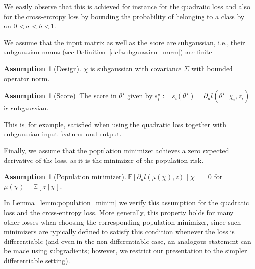 \documentclass{article}
\theoremstyle{plain}
\theoremstyle{definition}
\newtheorem{assumption}[theorem]{Assumption}
\theoremstyle{remark}
\newcommand{\e}[1]{\mathbb{E}\left[#1\right]  } %
\begin{document}
 We easily observe that this is achieved for instance for the quadratic loss and also for the cross-entropy loss by bounding the probability of belonging to a class by an $0<a<b<1$. 
 
We assume that the input matrix as well as the score are subgaussian, i.e., their subgaussian norms (see Definition~\ref{def:subgaussian_norm}) are finite.
 
 \begin{assumption}[Design]\label{ass:design_mat}
  $\chi$ is subgaussian with covariance $\Sigma$ with bounded operator norm.
 \end{assumption}
 
 
 \begin{assumption}[Score]\label{ass:score_subgau}
  The score in $\theta^\star$ given by $s_i^\star:=s_i(\theta^\star)=\partial_u l({\theta^\star}^\top \chi_i, z_i)$ is subgaussian.
 \end{assumption}
 
This is, for example, satisfied when using the quadratic loss together with subgaussian input features and output.

Finally, we assume that the population minimizer achieves a zero expected derivative of the loss, as it is the minimizer of the population risk.
 
 \begin{assumption}[Population minimizer]\label{ass:pop_minim}
  $\e{\partial_u l(\mu(\chi), z)\mid \chi}=0$ for $\mu(\chi)=\e{z\mid \chi}$.
 \end{assumption}
 
 
In Lemma~\ref{lemm:population_minim} we verify this assumption for the quadratic loss and the cross-entropy loss. 
More generally, this property holds for many other losses when choosing the corresponding population minimizer, 
since such minimizers are typically defined to satisfy this condition whenever the loss is differentiable 
(and even in the non-differentiable case, an analogous statement can be made using subgradients; however, 
we restrict our presentation to the simpler differentiable setting).

 
 
\end{document}
